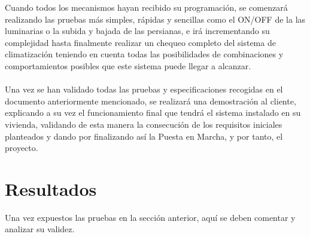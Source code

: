 Cuando todos los mecanismos hayan recibido su programación, se comenzará realizando las pruebas más simples, rápidas y sencillas como el ON/OFF de la las luminarias o la subida y bajada de las persianas, e irá incrementando su complejidad hasta finalmente realizar un chequeo completo del sistema de climatización teniendo en cuenta todas las posibilidades de combinaciones y comportamientos posibles que este sistema puede llegar a alcanzar. \\\\
Una vez se han validado todas las pruebas y especificaciones recogidas en el documento anteriormente mencionado, se realizará una demostración al cliente, explicando a su vez el funcionamiento final que tendrá el sistema instalado en su vivienda, validando de esta manera la consecución de los requisitos iniciales planteados y dando por finalizando así la Puesta en Marcha, y por tanto, el proyecto.


\section{Resultados}

Una vez expuestos las pruebas en la sección anterior, aquí se deben comentar y analizar su validez.